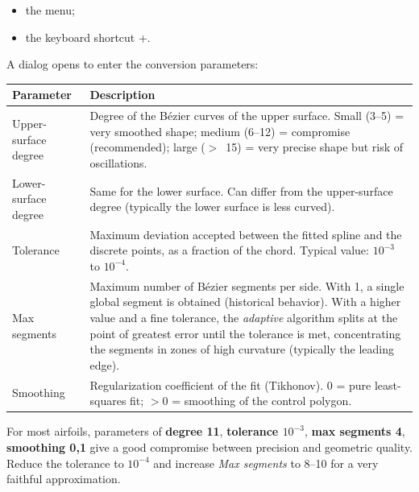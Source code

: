 \begin{itemize}
    \item the  menu;
    \item the keyboard shortcut +.
\end{itemize}

A dialog opens to enter the conversion parameters:


\begin{tabularx}{\linewidth}{l X}
    \toprule
    \textbf{Parameter} & \textbf{Description} \\
    \midrule
    Upper-surface degree
        & Degree of the Bézier curves of the upper surface.
          Small (3--5) = very smoothed shape; medium (6--12) =
          compromise (recommended); large ($>$~15) = very precise
          shape but risk of oscillations.\\
    Lower-surface degree
        & Same for the lower surface. Can differ from the
          upper-surface degree (typically the lower surface is less
          curved).\\
    Tolerance
        & Maximum deviation accepted between the fitted spline and
          the discrete points, as a fraction of the chord.
          Typical value: $10^{-3}$ to $10^{-4}$.\\
    Max segments
        & Maximum number of Bézier segments per side.
          With 1, a single global segment is obtained (historical
          behavior). With a higher value and a fine tolerance, the
          \emph{adaptive} algorithm splits at the point of greatest
          error until the tolerance is met, concentrating the
          segments in zones of high curvature (typically the leading
          edge).\\
    Smoothing
        & Regularization coefficient of the fit (Tikhonov).
          $0$ = pure least-squares fit; $>0$ = smoothing of the
          control polygon.\\
    \bottomrule
\end{tabularx}

\begin{astuce}
For most airfoils, parameters of \textbf{degree 11},
\textbf{tolerance $10^{-3}$}, \textbf{max segments 4},
\textbf{smoothing 0{,}1} give a good compromise between precision
and geometric quality. Reduce the tolerance to $10^{-4}$ and
increase \emph{Max segments} to 8--10 for a very faithful
approximation.
\end{astuce}

